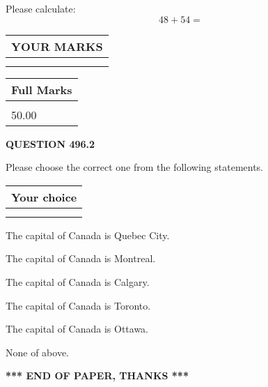 \documentclass[12pt]{article}
\begin{document}
  
 
Please calculate:
\begin{equation}
48 +  %
54 = \nonumber
\end{equation}
 

 

 
  
\vspace{0.2in}
  
\noindent\begin{tabular}{|l|}
\hline
 YOUR MARKS  \\
\hline
 \\ 
 \\ 
\hline
\end{tabular}
\hspace{0.05in} \begin{tabular}{|l|}
\hline
 Full Marks  \\
\hline
 \\ 
50.00 \\
\hline
\end{tabular}
{\textbf{\Large{QUESTION
496.2 
}}}
  
  
Please choose the correct one from the following statements.
  
  
\noindent\hspace{3.0in} \begin{tabular}{|l|}
\hline
Your choice \\
\hline
 \\ 
 \\ 
\hline
\end{tabular}
  
  
 
 
The capital of Canada is Quebec City.
 
 
The capital of Canada is Montreal.
 
 
The capital of Canada is Calgary.
 
 
The capital of Canada is Toronto.
 
 
The capital of Canada is Ottawa.
 
 
 None of above.
 
 
   
   
 \vspace{0.2in}
 
   
   
   
   
\vspace{1.0in} 
{\textbf{\large{ *** END OF PAPER, THANKS *** }}} 
   
\end{document}
